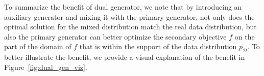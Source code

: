 




To summarize the benefit of dual generator, we note that by introducing an auxiliary generator and mixing it with the primary generator, not only does the optimal solution for the mixed distribution match the real data distribution, but also the primary generator can better optimize the secondary objective $f$ on the part of the domain of $f$ that is within the support of the data distribution $p_\mathcal{D}$. To better illustrate the benefit, we provide a visual explanation of the benefit in Figure~\ref{fig:dual_gen_viz}.


